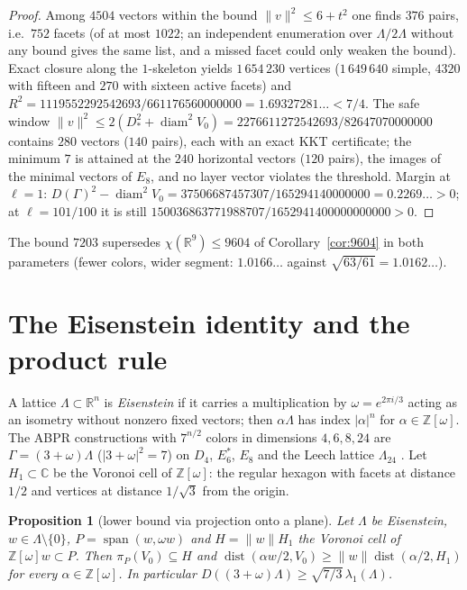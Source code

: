 \documentclass[10pt]{article}
\theoremstyle{plain}
\newtheorem{proposition}[theorem]{Proposition}
\theoremstyle{remark}
\newcommand{\R}{\mathbb{R}}
\newcommand{\Z}{\mathbb{Z}}
\newcommand{\CC}{\mathbb{C}}
\newcommand{\diam}{\operatorname{diam}}
\newcommand{\dist}{\operatorname{dist}}
\begin{document}
\begin{proof}
Among $4504$ vectors within the bound $\|v\|^2\le6+t^2$ one finds $376$
pairs, i.e.\ $752$ facets (of at most $1022$; an independent enumeration
over $\Lambda/2\Lambda$ without any bound gives the same list, and a missed
facet could only weaken the bound). Exact closure along the $1$-skeleton
yields $1\,654\,230$ vertices ($1\,649\,640$ simple, $4320$ with fifteen and
$270$ with sixteen active facets) and
$R^2=1119552292542693/661176560000000=1.69327281\ldots<7/4$. The safe window
$\|v\|^2\le2(D_*^2+\diam^2V_0)=2276611272542693/82647070000000$ contains
$280$ vectors ($140$ pairs), each with an exact KKT certificate; the minimum
$7$ is attained at the $240$ horizontal vectors ($120$ pairs), the images of
the minimal vectors of $E_8$, and no layer vector violates the threshold.
Margin at $\ell=1$: $D(\Gamma)^2-\diam^2V_0=37506687457307/165294140000000
=0.2269\ldots>0$; at $\ell=101/100$ it is still
$150036863771988707/1652941400000000000>0$.
\end{proof}

The bound $7203$ supersedes $\chi(\R^9)\le9604$ of Corollary~\ref{cor:9604}
in both parameters (fewer colors, wider segment: $1.0166\ldots$ against
$\sqrt{63/61}=1.0162\ldots$).

\section{The Eisenstein identity and the product rule}\label{sec:identity}

A lattice $\Lambda\subset\R^n$ is \emph{Eisenstein} if it carries a
multiplication by $\omega=e^{2\pi i/3}$ acting as an isometry without
nonzero fixed vectors; then $\alpha\Lambda$ has index $|\alpha|^n$ for
$\alpha\in\Z[\omega]$. The ABPR constructions with $7^{n/2}$ colors in
dimensions $4,6,8,24$ are $\Gamma=(3+\omega)\Lambda$ ($|3+\omega|^2=7$) on
$D_4$, $E_6^*$, $E_8$ and the Leech lattice $\Lambda_{24}$ \cite{ABPR}. Let
$H_1\subset\CC$ be the Voronoi cell of $\Z[\omega]$: the regular hexagon with
facets at distance $1/2$ and vertices at distance $1/\sqrt3$ from the origin.

\begin{proposition}[lower bound via projection onto a plane]\label{prop:planar}
Let $\Lambda$ be Eisenstein, $w\in\Lambda\setminus\{0\}$,
$P=\operatorname{span}(w,\omega w)$ and $H=\|w\|H_1$ the Voronoi cell of
$\Z[\omega]w\subset P$. Then $\pi_P(V_0)\subseteq H$ and
$\dist(\alpha w/2,V_0)\ge\|w\|\dist(\alpha/2,H_1)$ for every
$\alpha\in\Z[\omega]$. In particular
$D((3+\omega)\Lambda)\ge\sqrt{7/3}\,\lambda_1(\Lambda)$.
\end{proposition}
\end{document}

